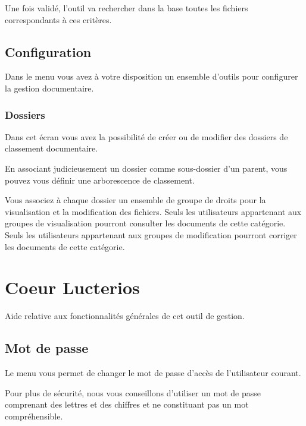 \documentclass[a4paper,10pt,oneside,french]{sphinxmanual}
\begin{document}
Une fois validé, l’outil va rechercher dans la base toutes les fichiers correspondants à ces critères.


\section{Configuration}
\label{\detokenize{documents/configuration::doc}}\label{\detokenize{documents/configuration:configuration}}
Dans le menu  vous avez à votre disposition un ensemble d’outils pour configurer la gestion documentaire.


\subsection{Dossiers}
\label{\detokenize{documents/configuration:dossiers}}
Dans cet écran vous avez la possibilité de créer ou de modifier des dossiers de classement documentaire.

\noindent{}

En associant judicieusement un dossier comme sous-dossier d’un parent, vous pouvez vous définir une arborescence de classement.

Vous associez à chaque dossier un ensemble de groupe de droits pour la visualisation et la modification des fichiers. Seuls les utilisateurs appartenant aux groupes de visualisation pourront consulter les documents de cette catégorie. Seuls les utilisateurs appartenant aux groupes de modification pourront corriger les documents de cette catégorie.


\chapter{Coeur Lucterios}
\label{\detokenize{CORE/index::doc}}\label{\detokenize{CORE/index:coeur-lucterios}}
Aide relative aux fonctionnalités générales de cet outil de gestion.


\section{Mot de passe}
\label{\detokenize{CORE/password::doc}}\label{\detokenize{CORE/password:mot-de-passe}}
Le menu  vous permet de changer le mot de passe d’accès de l’utilisateur courant.

\noindent{}

Pour plus de sécurité, nous vous conseillons d’utiliser un mot de passe comprenant des lettres et des chiffres et ne constituant pas un mot compréhensible.
\end{document}
